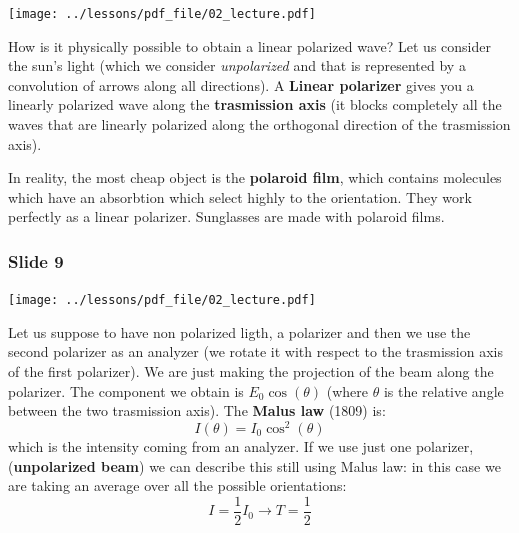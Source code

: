 \documentclass[../main/main.tex]{subfiles}
\begin{document}
\begin{minipage}[]{0.5\linewidth}
\centering
\texttt{[image: ../lessons/pdf\_file/02\_lecture.pdf]}
\end{minipage}
\hspace{0.3cm}\vspace{0.3cm}
\begin{minipage}[c]{0.47\linewidth}
How is it physically possible to obtain a linear polarized wave? Let us consider the sun's light (which we consider \emph{unpolarized} and that is represented by a convolution of arrows along all directions).
A \textbf{Linear polarizer} gives you a linearly polarized wave along the \textbf{trasmission axis} (it blocks completely all the waves that are linearly polarized along the orthogonal direction of the trasmission axis).

In reality, the most cheap object is the \textbf{polaroid film}, which contains molecules which have an absorbtion which select highly to the orientation. They work perfectly as a linear polarizer. Sunglasses are made with polaroid films.
\end{minipage}

\subsubsection*{Slide 9}

\begin{minipage}[]{0.5\linewidth}
\centering
\texttt{[image: ../lessons/pdf\_file/02\_lecture.pdf]}
\end{minipage}
\hspace{0.3cm}\vspace{0.3cm}
\begin{minipage}[c]{0.47\linewidth}
Let us suppose to have non polarized ligth, a polarizer and then we use the second polarizer as an analyzer (we rotate it with respect to the trasmission axis of the first polarizer). We are just making the projection of the beam along the polarizer. The component we obtain is \( E_0 \cos(\theta )  \) (where \( \theta  \) is the relative angle between the two trasmission axis).
The \textbf{Malus law} (1809) is:
\begin{equation*}
  I(\theta ) = I_0 \cos^2(\theta )
\end{equation*}
which is the intensity coming from an analyzer. If we use just one polarizer, (\textbf{unpolarized beam}) we can describe this still using Malus law: in this case we are taking an average over all the possible orientations:
\begin{equation*}
  I = \frac{1}{2} I_0 \rightarrow T = \frac{1}{2}
\end{equation*}

\end{minipage}
\end{document}
